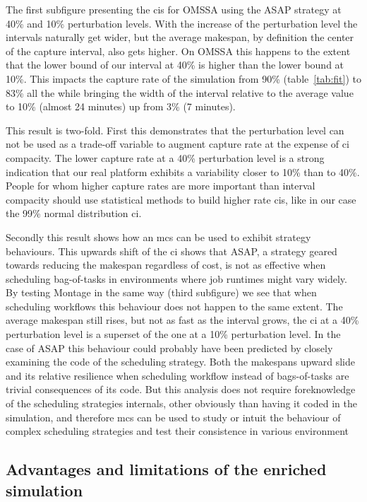 \documentclass[10pt,conference,compsocconf]{IEEEtran}
\begin{document}
The first subfigure presenting the \acp{ci} for OMSSA using the ASAP strategy at
40\% and 10\% perturbation levels. With the increase of the perturbation level
the intervals naturally get wider, but the average makespan, by definition the
center of the capture interval, also gets higher. On OMSSA this happens to the
extent that the lower bound of our interval at 40\% is higher than the lower
bound at 10\%. This impacts the capture rate of the simulation from 90\%
(table~\ref{tab:fit}) to 83\% all the while bringing the width of the interval
relative to the average value to 10\% (almost 24 minutes) up from 3\% (7 minutes).

This result is two-fold. First this demonstrates that the perturbation level can
not be used as a trade-off variable to augment capture rate at the expense of
\ac{ci} compacity. The lower capture rate at a 40\% perturbation level is a
strong indication that our real platform exhibits a variability closer to
10\% than to 40\%. People for whom higher capture rates are more important than
interval compacity should use statistical methods to build higher rate \acp{ci},
like in our case the 99\% normal distribution \ac{ci}.

Secondly this result shows how an \ac{mcs} can be used to exhibit strategy
behaviours. This upwards shift of the \ac{ci} shows that ASAP, a strategy
geared towards reducing the makespan regardless of cost, is not as effective
when scheduling bag-of-tasks in environments where job runtimes might vary
widely. By testing Montage in the same way (third subfigure) we see that when
scheduling workflows this behaviour does not happen to the same extent. The
average makespan still rises, but not as fast as the interval grows, the \ac{ci}
at a 40\% perturbation level is a superset of the one at a 10\% perturbation
level. In the case of ASAP this behaviour could probably have been predicted by
closely examining the code of the scheduling strategy. Both the makespans upward
slide and its relative resilience when scheduling workflow instead of
bags-of-tasks are trivial consequences of its code. But this analysis does not
require foreknowledge of the scheduling strategies internals, other obviously
than having it coded in the simulation, and therefore \ac{mcs} can be used to
study or intuit the behaviour of complex scheduling strategies and test their
consistence in various environment 


\subsection{Advantages and limitations of the enriched simulation}\label{sec:lim}
\end{document}
